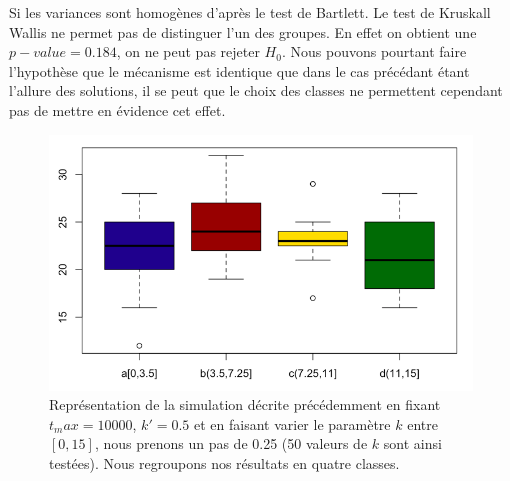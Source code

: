 \documentclass[12pt]{article}
\begin{document}
\begin{minipage}{0.5\textwidth}
 Si les variances sont homogènes d'après le test de Bartlett. Le test de Kruskall Wallis  ne permet pas de distinguer l'un des groupes. En effet on obtient une $p-value = 0.184$, on ne peut pas rejeter $H_0$. Nous pouvons pourtant faire l'hypothèse que le mécanisme est identique que dans le cas précédant étant l'allure des solutions, il se peut que le choix des classes ne permettent cependant pas de mettre en évidence cet effet.
\end{minipage} \hfill
\begin{minipage}{0.45\textwidth}
\begin{figure}[H]
\includegraphics[width=1\textwidth]{nombresucces_k_G.png}
\caption{Représentation de la simulation décrite précédemment en fixant $t_max=10000$, $k'=0.5$ et en faisant varier le paramètre $k$ entre $[0,15]$, nous prenons un pas de 0.25 (50 valeurs de $k$ sont ainsi testées). Nous regroupons nos résultats en quatre classes.}
\label{Q2K}
\end{figure}
\end{minipage}
\end{document}
